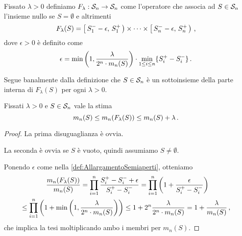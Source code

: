 \begin{definition}\label{def:AllargamentoSemiaperti}
	Fissato $\lambda>0$ definiamo $F_\lambda:\S_n\to\S_n$ come l'operatore che associa ad $S\in\S_n$ l'insieme nullo se $S=\emptyset$ e altrimenti
	\begin{equation*}
		F_\lambda(S)=\co{S^-_1-\epsilon}{S^+_1}\times\cdots\times\co{S^-_n-\epsilon}{S^+_n} \virgola
	\end{equation*}
	dove $\epsilon>0$ è definito come
	\begin{equation*}
		\epsilon=\min\left(1,\frac{\lambda}{2^n\cdot m_n(S)}\right)\cdot\min_{1\le i\le n}\{S^+_i-S^-_i\} \punto
	\end{equation*}
\end{definition}
\begin{remark}\label{nota:ParteInternaAllargamento}
	Segue banalmente dalla definizione che $S\in\S_n$ è un sottoinsieme della parte interna di $F_\lambda(S)$ per ogni $\lambda>0$.
\end{remark}

\begin{proposition}\label{prop:MisuraAllargamento}
	Fissati $\lambda>0$ e $S\in\S_n$ vale la stima
	\begin{equation*}
		m_n(S)\le m_n(F_\lambda(S))\le m_n(S)+\lambda \punto
	\end{equation*}
\end{proposition}
\begin{proof}
	La prima disuguaglianza è ovvia.
	
	La seconda è ovvia se $S$ è vuoto, quindi assumiamo $S\not=\emptyset$.
	
	Ponendo $\epsilon$ come nella \cref{def:AllargamentoSemiaperti}, otteniamo
	\begin{multline*}
		\frac{m_n(F_\lambda(S))}{m_n(S)}=\prod_{i=1}^n\frac{S^+_i-S^-_i+\epsilon}{S^+_i-S^-_i}=
		\prod_{i=1}^n\left(1+\frac{\epsilon}{S^+_i-S^-_i}\right)\\\le
		\prod_{i=1}^n\left(1+\min\left(1,\frac{\lambda}{2^n\cdot m_n(S)}\right)\right)\le
		1+2^n\frac{\lambda}{2^n\cdot m_n(S)}=1+\frac{\lambda}{m_n(S)} \virgola
	\end{multline*}
	che implica la tesi moltiplicando ambo i membri per $m_n(S)$.
\end{proof}


